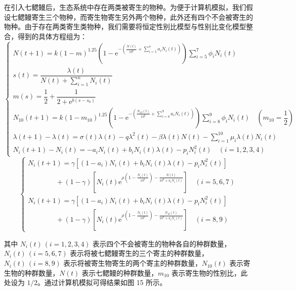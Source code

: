 \documentclass[11pt,a4paper]{ctexart}
\begin{document}
在引入七鳃鳗后，生态系统中存在两类被寄生的物种。为便于计算机模拟，我们假设七鳃鳗寄生三个物种，而寄生物寄生另外两个物种，此外还有四个不会被寄生的物种。由于存在两类寄生类物种，我们需要将恒定性别比模型与性别比变化模型整合，得到的具体方程组为：
\begin{equation}
\begin{cases}
N(t+1)=k(1-m)^{1.25}\left(1-\mathrm{e}^{-\left(\frac{N(t)}{10^{6}}+\sum\limits_{i=5}^{7}a_{i}N_{i}(t)\right)}\right)\sum\limits_{i=5}^{7}\phi_{i}N_{i}(t)\\[6pt]
s(t)=\dfrac{\lambda(t)}{N(t)+\sum\limits_{i=1}^{n}N_{i}(t)}\\[6pt]
m(s)=\dfrac{1}{2}+\dfrac{1}{2+\mathrm{e}^{b(s-s_{0})}}\\[6pt]
N_{10}(t+1)=k(1-m_{10})^{1.25}\left(1-\mathrm{e}^{-\left(\frac{N_{10}(t)}{10^{6}}+\sum\limits_{i=8}^{9}a_{i}N_{i}(t)\right)}\right)\sum\limits_{i=8}^{9}\phi_{i}N_{i}(t)\quad \left(m_{10}=\dfrac{1}{2}\right)\\[6pt]
\lambda(t+1)-\lambda(t)=\sigma(t)\lambda(t)-q\lambda^{2}(t)-\beta\lambda(t)N(t)-\sum\limits_{i=1}^{10}\mu_{i}\lambda(t)N_{i}(t)\\[6pt]
N_{i}(t+1)-N_{i}(t)=-a_{i}N_{i}(t)+b_{i}N_{i}(t)\lambda(t)-p_{i}N_{i}^{2}(t)\quad (i=1,2,3,4)
\end{cases}
\end{equation}
\begin{equation}
\begin{cases}
N_{i}(t+1)=\gamma\left[(1-a_{i})N_{i}(t)+b_{i}N_{i}(t)\lambda(t)-p_{i}N_{i}^{2}(t)\right]\\
\qquad\qquad +(1-\gamma)\left[N_{i}(t)\mathrm{e}^{\rho\left(1-\frac{N_{i}(t)}{10^{6}}\right)-\frac{N(t)}{10^{6}+a_{i}N_{i}(t)}}\right]\quad (i=5,6,7)\\[6pt]
N_{i}(t+1)=\gamma\left[(1-a_{i})N_{i}(t)+b_{i}N_{i}(t)\lambda(t)-p_{i}N_{i}^{2}(t)\right]\\
\qquad\qquad +(1-\gamma)\left[N_{i}(t)\mathrm{e}^{\rho\left(1-\frac{N_{i}(t)}{10^{6}}\right)-\frac{N_{10}(t)}{10^{6}+a_{i}N_{i}(t)}}\right]\quad (i=8,9)
\end{cases}
\end{equation}

其中 $N_{i}(t)\,(i=1,2,3,4)$ 表示四个不会被寄生的物种各自的种群数量，$N_{i}(t)\,(i=5,6,7)$ 表示将被七鳃鳗寄生的三个寄主的种群数量，$N_{i}(t)\,(i=8,9)$ 表示将被寄生物寄生的两个寄主的种群数量，$N_{10}(t)$ 表示寄生物的种群数量，$N(t)$ 表示七鳃鳗的种群数量，$m_{10}$ 表示寄生物的性别比，此处设为 $1/2$。通过计算机模拟可得结果如图 15 所示。
\end{document}
